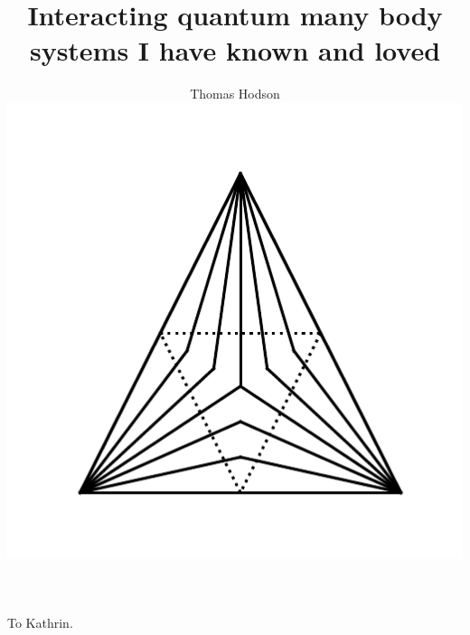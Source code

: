 \documentclass[a4paper,12pt]{report}
\begin{document}
\title{\LARGE {\bf Interacting quantum many body systems I have known and loved}\\
 \vspace*{6mm}
}

\author{Thomas Hodson\\\vspace{10mm}
\includegraphics[width=.4\textwidth,height=.4\textheight]{figure_code/logo/logo}
\vspace{-0.4\textheight}
\vspace{10mm}
}


\maketitle

\preface

\begin{abstract}

\end{abstract}



\cleardoublepage
{}
\begin{acknowledgements}

\end{acknowledgements}

\cleardoublepage
\vspace*{100mm} %
\begin{center}To Kathrin.\end{center}
\end{document}
